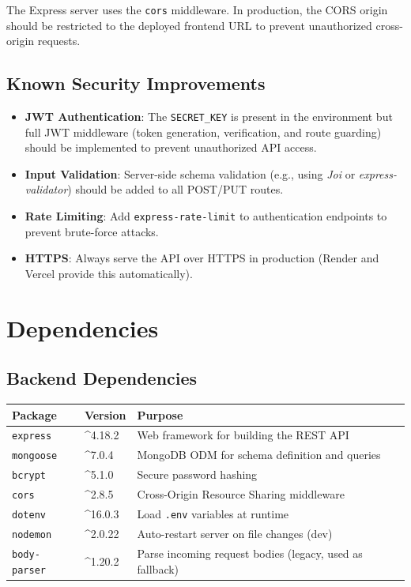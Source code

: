 \documentclass[12pt,a4paper]{report}
\begin{document}
The Express server uses the \texttt{cors} middleware. In production, the CORS origin should be restricted to the deployed frontend URL to prevent unauthorized cross-origin requests.

\section{Known Security Improvements}

\begin{itemize}[leftmargin=2em]
  \item \textbf{JWT Authentication}: The \texttt{SECRET\_KEY} is present in the environment but full JWT middleware (token generation, verification, and route guarding) should be implemented to prevent unauthorized API access.
  \item \textbf{Input Validation}: Server-side schema validation (e.g., using \textit{Joi} or \textit{express-validator}) should be added to all POST/PUT routes.
  \item \textbf{Rate Limiting}: Add \texttt{express-rate-limit} to authentication endpoints to prevent brute-force attacks.
  \item \textbf{HTTPS}: Always serve the API over HTTPS in production (Render and Vercel provide this automatically).
\end{itemize}

\chapter{Dependencies}

\section{Backend Dependencies}

\begin{longtable}{@{}p{4cm}p{2.5cm}p{7.5cm}@{}}
  \toprule
  \textbf{Package} & \textbf{Version} & \textbf{Purpose} \\
  \midrule
  \endhead
  \texttt{express} & \^{}4.18.2 & Web framework for building the REST API \\[3pt]
  \texttt{mongoose} & \^{}7.0.4 & MongoDB ODM for schema definition and queries \\[3pt]
  \texttt{bcrypt} & \^{}5.1.0 & Secure password hashing \\[3pt]
  \texttt{cors} & \^{}2.8.5 & Cross-Origin Resource Sharing middleware \\[3pt]
  \texttt{dotenv} & \^{}16.0.3 & Load \texttt{.env} variables at runtime \\[3pt]
  \texttt{nodemon} & \^{}2.0.22 & Auto-restart server on file changes (dev) \\[3pt]
  \texttt{body-parser} & \^{}1.20.2 & Parse incoming request bodies (legacy, used as fallback) \\
  \bottomrule
\end{longtable}
\end{document}
